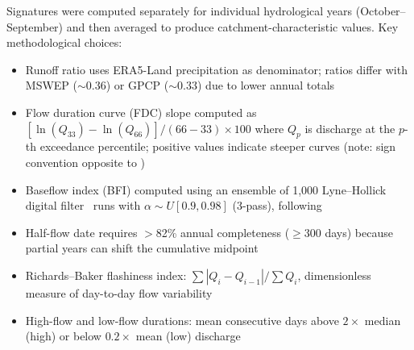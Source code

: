 Signatures were computed separately for individual hydrological years (October--September) and then averaged to produce catchment-characteristic values.
Key methodological choices:
\begin{itemize}
    \item Runoff ratio uses ERA5-Land precipitation as denominator; ratios differ with MSWEP ($\sim$0.36) or GPCP ($\sim$0.33) due to lower annual totals
    \item Flow duration curve (FDC) slope computed as $[\ln(Q_{33}) - \ln(Q_{66})] / (66 - 33) \times 100$ where $Q_p$ is discharge at the $p$-th exceedance percentile; positive values indicate steeper curves (note: sign convention opposite to \citealt{Sawicz2011})
    \item Baseflow index (BFI) computed using an ensemble of 1{,}000 Lyne--Hollick digital filter~\citep{Nathan1990} runs with $\alpha \sim U[0.9, 0.98]$ (3-pass), following \citet{Euser2013}
    \item Half-flow date requires $>$82\% annual completeness ($\geq$300 days) because partial years can shift the cumulative midpoint
    \item Richards--Baker flashiness index: $\sum|Q_i - Q_{i-1}| / \sum Q_i$, dimensionless measure of day-to-day flow variability
    \item High-flow and low-flow durations: mean consecutive days above $2\times$ median (high) or below $0.2\times$ mean (low) discharge
\end{itemize}




